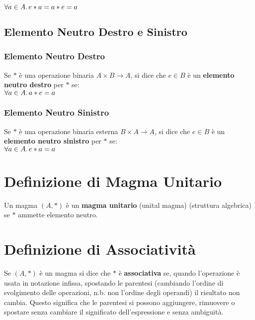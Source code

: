\documentclass[a4paper, twoside, italian, 11pt]{book}
\begin{document}
$\forall a \in A \ldotp e * a = a * e = a$


\subsection{Elemento Neutro Destro e Sinistro}


\subsubsection{Elemento Neutro Destro}

Se $*$ è una operazione binaria $A \times B \rightarrow A$, si dice che $e \in B$ è un \textbf{elemento neutro destro} per $*$ se: \\

$\forall a \in A \ldotp a * e = a$


\subsubsection{Elemento Neutro Sinistro}

Se $*$ è una operazione binaria esterna $B \times A \rightarrow A$, si dice che $e \in B$ è un \textbf{elemento neutro sinistro} per $*$ se: \\

$\forall a \in A \ldotp e * a = a$



\section{Definizione di Magma Unitario}

Un magma $(A, *)$ è un \textbf{magma unitario} (unital magma) (struttura algebrica) se $*$ ammette elemento neutro.



\section{Definizione di Associatività}

Se $(A, *)$ è un magma si dice che $*$ è \textbf{associativa} se, quando l'operazione è usata in notazione infissa, spostando le parentesi (cambiando l'ordine di svolgimento delle operazioni, n.b. non l'ordine degli operandi) il risultato non cambia. Questo significa che le parentesi si possono aggiungere, rimuovere o spostare senza cambiare il significato dell'espressione e senza ambiguità. \\
\end{document}
